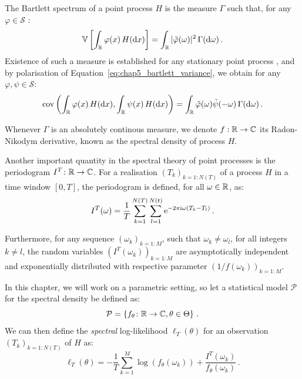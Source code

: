 The Bartlett spectrum of a point process $H$ is the measure $\Gamma$ such that, 
for any $\varphi\in\mathcal{S}$ \parencite[Definition 2]{Bremaud2005}:
\begin{equation}\label{eq:chap5_bartlett_variance}
    {\mathbb V}\left[\int_{{\mathbb R}}{\varphi(x)\,H({\mathrm{d}} x)}\right] = \int_{{\mathbb R}}{|\tilde\varphi(\omega)|^2\,\Gamma({\mathrm{d}} \omega)}\,.
\end{equation}
Existence of such a measure is established for any stationary point process \parencite[Proposition 8.2.I.(a)]{DaleyV1},
and by polarisation of Equation~\eqref{eq:chap5_bartlett_variance}, we obtain for any $\varphi, \psi \in \mathcal{S}$:
\begin{equation}\label{eq:chap5_bartlett_covariance}
    \operatorname{cov}\left(\int_{{\mathbb R}}{\varphi(x)\,H({\mathrm{d}} x)}, \int_{{\mathbb R}}{\psi(x)\,H({\mathrm{d}} x)}\right) = \int_{{\mathbb R}}{\tilde \varphi(\omega)\tilde \psi(-\omega)\,\Gamma({\mathrm{d}} \omega)}\,.
\end{equation}

Whenever $\Gamma$ is an absolutely continous measure, we denote $f:{\mathbb R}\to {\mathbb C}$ its Radon-Nikodym derivative, 
known as the spectral density of process $H$.

Another important quantity in the spectral theory of point processes is the periodogram $I^T\colon {\mathbb R} \to {\mathbb C}$.
For a realisation $(T_k)_{k=1:N(T)}$ of a process $H$ in a time window $[0,T]$, the periodogram is defined, for all $\omega\in{\mathbb R}$, as:
\[I^T(\omega) = \frac{1}{T}\sum_{k=1}^{N(T)}\sum_{l=1}^{N(t)}{\mathrm{e}^{-2\pi \mathrm{i} \omega (T_k - T_l)}}\,.\]

Furthermore, for any sequence $(\omega_k)_{k=1:M}$, such that $\omega_k \neq \omega_l$, for all integers $k\neq l$,
the random variables $(I^T(\omega_k))_{k=1:M}$ are asymptotically independent and exponentially distributed \parencite{Tuan1981} with respective parameter $(1/f(\omega_k))_{k=1:M}$.

In this chapter, we will work on a parametric setting, 
so let a statistical model $\mathcal{P}$ for the spectral density be defined as:
\[
    \mathcal{P} = \left\{
        f_\theta \colon {\mathbb R} \to {\mathbb C}, \theta \in \Theta
    \right\}\,.
\]
We can then define the \textit{spectral} log-likelihood $\ell_T(\theta)$ for an observation $(T_k)_{k=1:N(T)}$ of $H$ as:
\begin{equation}\label{eq:chap5_spectral_ll}
    \ell_T(\theta) = -\frac{1}{T}\sum_{k=1}^{M}{\log(f_\theta (\omega_k)) + \frac{I^T(\omega_k)}{f_\theta(\omega_k)}}\,.
\end{equation}

